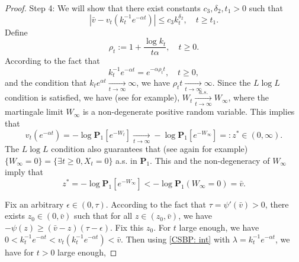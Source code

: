 \documentclass[12pt,a4paper]{amsart}
\theoremstyle{plain}
\theoremstyle{definition}
\numberwithin{equation}{section}
\begin{document}
\begin{proof}
    Step 4: We will show that there exist
    constants $c_3, \delta_2, t_1>0$ such that
\[
    |\bar v - v_t(k_t^{-1} e^{-\alpha t})|\leq
    c_3k_t^{\delta_2}, \quad t\geq t_1.
\]
    Define
\[
    \rho_t := 1+ \frac{\log k_t}{t\alpha}, \quad t\geq 0.
\]
    According to the fact that
\[
    k_t^{-1}e^{-\alpha t} = e^{-\alpha \rho_t t}, \quad t\geq 0,
\]
    and the condition that $k_t e^{\alpha t} \xrightarrow[t\to \infty]{} \infty$,
    we have $\rho_t t \xrightarrow[t\to \infty]{} \infty $.
    Since the $L\log L$ condition is satisfied, we have (see \cite{LiuRenSong2009Llog} for
 example), $W_t \xrightarrow[t\to \infty]{a.s.} W_\infty$, where the martingale limit $W_\infty$ is a non-degenerate positive random variable. This implies that
\[
    v_t(e^{-\alpha t}) = -\log \mathbf P_1[e^{-W_t}]\xrightarrow[t\to \infty]{} - \log \mathbf P_{1}[e^{-W_\infty}] =: z^* \in (0,\infty).
\]
    The $L \log L$ condition also guarantees that (see again \cite{LiuRenSong2009Llog}
    for example) $\{W_\infty = 0\} = \{\exists t \geq 0, X_t= 0\}$  a.s. in $\mathbf P_1$. This and the non-degeneracy of $W_\infty$ imply that
\[
    z^*=-\log \mathbf P_1[e^{-W_\infty}] < -\log \mathbf P_1(W_\infty = 0) = \bar v.
\]

    Fix an arbitrary $\epsilon \in (0,\tau)$.
    According to the fact that $\tau=\psi'(\bar v)>0$, there exists $z_0 \in (0,\bar v)$ such that for all $z\in (z_0, \bar v)$, we have $-\psi(z)\geq (\bar v - z)(\tau- \epsilon)$.     Fix this $z_0$.
    For $t$ large enough, we have $0<k_t^{-1}e^{-\alpha t} < v_t(k_t^{-1}e^{-\alpha t})< \bar v$.
        Then using \eqref{CSBP: int} with $\lambda=k_t^{-1} e^{-\alpha t}$, we have for $t>0$ large enough,


\end{proof}
\end{document}
